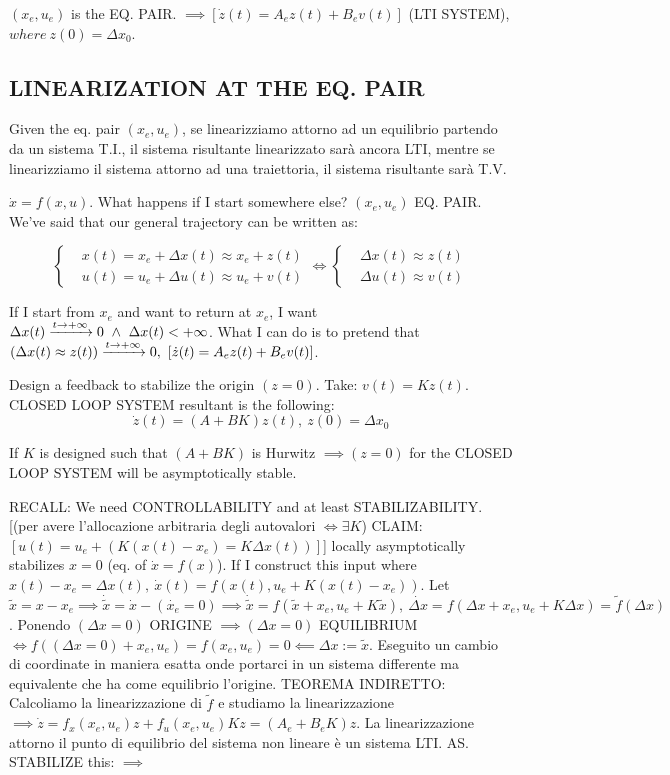 $(x_e,u_e)$ is the EQ. PAIR. $\implies [\dot{z}(t) = A_ez(t) + B_ev(t)]$ (LTI SYSTEM), $where\ z(0) = \Delta x_0$.

\subsection{LINEARIZATION AT THE EQ. PAIR}

Given the eq. pair $(x_e,u_e)$, se linearizziamo attorno ad un equilibrio partendo da un sistema T.I., il sistema risultante linearizzato sarà ancora LTI, mentre se linearizziamo il sistema attorno ad una traiettoria, il sistema risultante sarà T.V.

$\dot{x}=f(x,u)$. What happens if I start somewhere else? $(x_e,u_e)$ EQ. PAIR. We've said that our general trajectory can be written as:

\[
	\left\{
	\begin{aligned}
	&x(t) = x_e + \Delta x(t) \approx x_e + z(t) \\
	&u(t) = u_e + \Delta u(t) \approx u_e + v(t)
	\end{aligned} 
	\right. \iff
	\left\{
	\begin{aligned}
	&\Delta x(t) \approx z(t) \\
	&\Delta u(t) \approx v(t)
	\end{aligned} 
	\right.
\]

If I start from $x_e$ and want to return at $x_e$, I want $\Delta x(t) \tendsto{t\to +\infty} 0\ \land\ \Delta x(t) < +\infty$. What I can do is to pretend that $(\Delta x(t) \approx z(t)) \tendsto{t\to +\infty} 0,\ [\dot{z}(t) = A_ez(t) + B_ev(t)]$.

Design a feedback to stabilize the origin $(z=0)$. Take: $v(t) = Kz(t)$. CLOSED LOOP SYSTEM resultant is the following:
\[
	\dot{z}(t) = (A+BK)z(t),\ z(0) = \Delta x_0
\]

If $K$ is designed such that $(A+BK)$ is Hurwitz $\implies (z=0)$ for the CLOSED LOOP SYSTEM will be asymptotically stable.

RECALL: We need CONTROLLABILITY and at least STABILIZABILITY.
[(per avere l'allocazione arbitraria degli autovalori $\iff \exists K$) CLAIM: $[u(t) = u_e + (K(x(t)-x_e) = K \Delta x(t))]$] locally asymptotically stabilizes $x=0$ (eq. of $\dot{x}=f(x)$). If I construct this input where $x(t)-x_e = \Delta x(t),\ \dot{x}(t) = f(x(t),u_e +K(x(t)-x_e))$. Let $\tilde{x} = x-x_e \implies \dot{\tilde{x}} = \dot{x} - (\dot{x_e} = 0) \implies \dot{\tilde{x}} = f(\tilde{x}+x_e,u_e + K\tilde{x}),\ \dot{\Delta x} = f(\Delta x + x_e,u_e + K\Delta x) = \tilde{f}(\Delta x)$.
Ponendo $(\Delta x = 0)$ ORIGINE $\implies (\Delta x = 0)$ EQUILIBRIUM $\iff f((\Delta x = 0)+x_e,u_e) = f(x_e,u_e) = 0 \impliedby \Delta x := \tilde{x}$. Eseguito un cambio di coordinate in maniera esatta onde portarci in un sistema differente ma equivalente che ha come equilibrio l'origine. TEOREMA INDIRETTO: Calcoliamo la linearizzazione di $\tilde{f}$ e studiamo la linearizzazione $\implies \dot{z} = f_x(x_e,u_e)z + f_u(x_e,u_e)Kz = (A_e+B_eK)z$. La linearizzazione attorno il punto di equilibrio del sistema non lineare è un sistema LTI. AS. STABILIZE this: $\implies$

